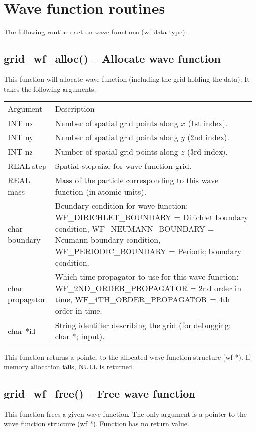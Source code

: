 \documentclass[12pt,letterpaper]{report}
\begin{document}
\section{Wave function routines}

The following routines act on wave functions (wf data type).

\subsection{grid\_wf\_alloc() -- Allocate wave function}

This function will allocate wave function (including the grid holding the data). It takes the following arguments:
\begin{longtable}{p{} p{}}
Argument & Description\\
\cline{1-2}
INT nx & Number of spatial grid points along $x$ (1st index).\\
INT ny & Number of spatial grid points along $y$ (2nd index).\\
INT nz & Number of spatial grid points along $z$ (3rd index).\\
REAL step & Spatial step size for wave function grid.\\
REAL mass & Mass of the particle corresponding to this wave function (in atomic units).\\
char boundary & Boundary condition for wave function: WF\_DIRICHLET\_BOUNDARY = Dirichlet boundary condition, WF\_NEUMANN\_BOUNDARY = Neumann boundary condition, WF\_PERIODIC\_BOUNDARY = Periodic boundary condition.\\
char propagator & Which time propagator to use for this wave function: WF\_2ND\_ORDER\_PROPAGATOR = 2nd order in time, WF\_4TH\_ORDER\_PROPAGATOR = 4th order in time.\\
char *id & String identifier describing the grid (for debugging; char *; input).
\end{longtable}
\noindent
This function returns a pointer to the allocated wave function structure (wf *). If memory allocation fails, NULL is returned.

\subsection{grid\_wf\_free() -- Free wave function}

This function frees a given wave function. The only argument is a pointer to the wave function structure (wf *). Function has no return value.
\end{document}
